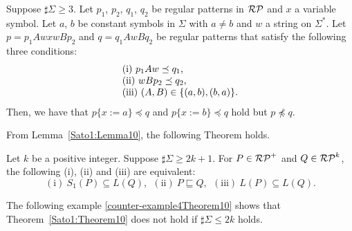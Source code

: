 \begin{lem}\label{Sato1:Lemma13}
    Suppose $\sharp\Sigma \geq 3$.
    Let $p_{1}$, $p_{2}$, $q_{1}$, $q_{2}$ be regular patterns in $\mathcal{RP}$ and $x$ a variable symbol.
    Let $a$, $b$ be constant symbols in $\Sigma$ with $a \neq b$ and $w$ a string on $\Sigma^{\ast}$.
    Let $p = p_{1}AwxwBp_{2}$ and $q = q_{1}AwBq_{2}$ be regular patterns that satisfy the following three conditions:
    \[
        \begin{tabular}{ll}
            $\mathrm{(i)}~p_{1}Aw \preceq q_{1}$,  \\ 
            $\mathrm{(ii)}~wBp_{2} \preceq q_{2}$, \\
            $\mathrm{(iii)}$ 
            $(A,B)\in \{(a,b),(b,a)\}$.
        \end{tabular}
    \]
    Then, we have that $p\{x:=a\} \preceq q$ and $p\{x:=b\} \preceq q$ hold 
    but $p \not\preceq q$.
\end{lem}

From Lemma~\ref{Sato1:Lemma10}, the following Theorem holds.
\begin{thm}\label{Sato1:Theorem10}
    Let $k$ be a positive integer. Suppose $\sharp\Sigma \geq 2k+1$.
    For $P \in \mathcal{RP}^{+}$ and $Q \in \mathcal{RP}^{k}$, 
    the following (i), (ii) and (iii) are equivalent:
    \[
        (\mathrm{i})\ S_{1}(P) \subseteq L(Q),\ \
        (\mathrm{ii})\ P \sqsubseteq Q,\ \
        (\mathrm{iii})\ L(P) \subseteq L(Q).
    \]
\end{thm}

The following example \ref{counter-example4Theorem10} shows  that Theorem~\ref{Sato1:Theorem10} does not hold 
if $\sharp\Sigma\leq 2k$ holds.


